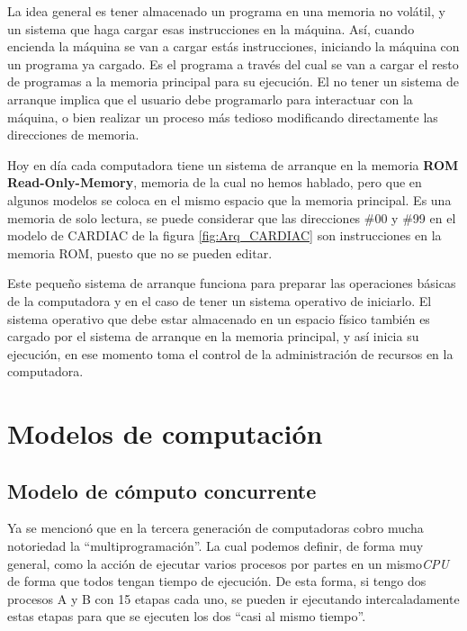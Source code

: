 \documentclass[letterpaper,12pt,oneside]{book}
\begin{document}
        La idea general es tener almacenado un programa en una memoria no volátil, y un sistema que haga cargar esas instrucciones en la máquina. Así,
cuando encienda la máquina se van a cargar estás instrucciones, iniciando la máquina con un programa ya cargado. Es el programa a través del cual
se van a cargar el resto de programas a la memoria principal para su ejecución. El no tener un sistema de arranque implica que el usuario debe programarlo
para interactuar con la máquina, o bien realizar un proceso más tedioso modificando directamente las direcciones de memoria\cite{tanenbaum_modern_2002}.
  
        Hoy en día cada computadora
		tiene un sistema de arranque  en la memoria \textbf{ROM Read-Only-Memory}, memoria de la cual no hemos hablado, pero que en algunos modelos
		se coloca en el mismo espacio que la memoria principal. Es una memoria de solo lectura, se puede considerar que las direcciones
		\#00 y \#99 en el modelo de CARDIAC de la figura \ref{fig:Arq_CARDIAC} son instrucciones en la memoria ROM, puesto que no se pueden editar\cite{tanenbaum_modern_2002}.
  
		Este pequeño sistema de arranque funciona para preparar las operaciones básicas de la computadora y en el caso de tener un sistema operativo
		de iniciarlo. El sistema operativo que debe estar almacenado en un espacio físico también es cargado por el sistema de arranque en la memoria
		principal, y así inicia su ejecución, en ese momento toma el control de la administración de recursos en la computadora\cite{tanenbaum_modern_2002}.

		\clearpage		
		
	\section{Modelos de computación}

		\subsection{Modelo de cómputo concurrente}
		
		Ya se mencionó que en la tercera generación de computadoras cobro mucha notoriedad la ``multiprogramación''. La cual podemos definir, de forma muy general, como la acción de ejecutar varios procesos por partes en un mismo\textit{CPU}
		de forma que todos tengan tiempo de ejecución. De esta forma, si tengo dos procesos A y B con 15 etapas cada uno, se pueden ir ejecutando
		intercaladamente estas etapas para que se ejecuten los dos ``casi al mismo tiempo''\cite{tanenbaum_modern_2002}.
  
\end{document}
